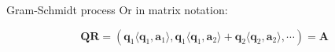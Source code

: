 \documentclass[11pt,compress,t,notes=noshow, xcolor=table]{beamer}
\begin{document}
\begin{vbframe}{Gram-Schmidt process}
Or in matrix notation:

$$
  \bm{Q} \bm{R} = (\bm{q}_1 \langle \bm{q}_1, \bm{a}_1 \rangle,
                   \bm{q}_1 \langle \bm{q}_1, \bm{a}_2 \rangle + \bm{q}_2 \langle \bm{q}_2, \bm{a}_2 \rangle,
                   \cdots) = \bm{A}
$$

%
%
%
%
%
%
%


\end{vbframe}
\end{document}
